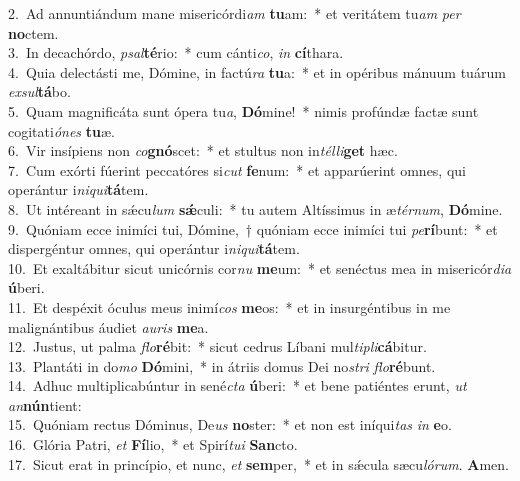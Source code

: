 {2.~}Ad annuntiándum mane misericórdi\textit{am} \textbf{tu}am:~* et veritátem tu\textit{am} \textit{per} \textbf{no}ctem.\\
{3.~}In decachórdo, \textit{psal}\textbf{té}rio:~* cum cánti\textit{co}, \textit{in} \textbf{cí}thara.\\
{4.~}Quia delectásti me, Dómine, in factú\textit{ra} \textbf{tu}a:~* et in opéribus mánuum tuárum \textit{ex}\textit{sul}\textbf{tá}bo.\\
{5.~}Quam magnificáta sunt ópera tu\textit{a}, \textbf{Dó}mine!~* nimis profúndæ factæ sunt cogitati\textit{ó}\textit{nes} \textbf{tu}æ.\\
{6.~}Vir insípiens non \textit{co}\textbf{gnó}scet:~* et stultus non in\textit{tél}\textit{li}\textbf{get} hæc.\\
{7.~}Cum exórti fúerint peccatóres si\textit{cut} \textbf{fe}num:~* et apparúerint omnes, qui operántur i\textit{ni}\textit{qui}\textbf{tá}tem.\\
{8.~}Ut intéreant in sǽcu\textit{lum} \textbf{sǽ}culi:~* tu autem Altíssimus in æ\textit{tér}\textit{num}, \textbf{Dó}mine.\\
{9.~}Quóniam ecce inimíci tui, Dómine,~† quóniam ecce inimíci tui \textit{pe}\textbf{rí}bunt:~* et dispergéntur omnes, qui operántur i\textit{ni}\textit{qui}\textbf{tá}tem.\\
{10.~}Et exaltábitur sicut unicórnis cor\textit{nu} \textbf{me}um:~* et senéctus mea in misericór\textit{di}\textit{a} \textbf{ú}beri.\\
{11.~}Et despéxit óculus meus inimí\textit{cos} \textbf{me}os:~* et in insurgéntibus in me malignántibus áudiet \textit{au}\textit{ris} \textbf{me}a.\\
{12.~}Justus, ut palma \textit{flo}\textbf{ré}bit:~* sicut cedrus Líbani mul\textit{ti}\textit{pli}\textbf{cá}bitur.\\
{13.~}Plantáti in do\textit{mo} \textbf{Dó}mini,~* in átriis domus Dei no\textit{stri} \textit{flo}\textbf{ré}bunt.\\
{14.~}Adhuc multiplicabúntur in sené\textit{cta} \textbf{ú}beri:~* et bene patiéntes erunt, \textit{ut} \textit{an}\textbf{nún}tient:\\
{15.~}Quóniam rectus Dóminus, De\textit{us} \textbf{no}ster:~* et non est iníqui\textit{tas} \textit{in} \textbf{e}o.\\
{16.~}Glória Patri, \textit{et} \textbf{Fí}lio,~* et Spirí\textit{tu}\textit{i} \textbf{San}cto.\\
{17.~}Sicut erat in princípio, et nunc, \textit{et} \textbf{sem}per,~* et in sǽcula sæcu\textit{ló}\textit{rum}. \textbf{A}men.\\
